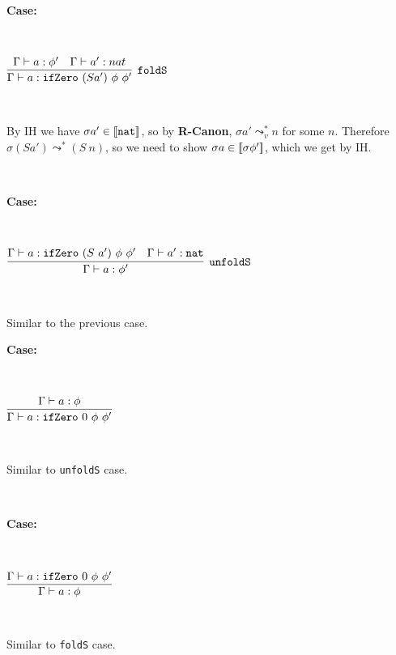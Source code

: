 \documentclass[copyright]{eptcs}
\newcommand{\nat}[0]{\texttt{nat}}
\newcommand{\leadstov}[0]{\leadsto_v}
\newcommand{\ifzero}[0]{\texttt{ifZero}}
\newcommand{\interp}[1]{[\negthinspace[#1]\negthinspace]}
\begin{document}
\ 

\noindent \textbf{Case:}

\

$\infer[\texttt{foldS}]
{\Gamma\vdash a : \ifzero\ (S a')\ \phi\ \phi'}
{\Gamma\vdash a : \phi' & \Gamma\vdash a':nat}$

\ 

\noindent By IH we have $\sigma a' \in \interp{\nat}$, so by \textbf{R-Canon}, $\sigma a' \leadstov^* n$ for some $n$. Therefore 
$\sigma (S a') \leadsto^* (S\ n)$, so we need to show $\sigma a \in \interp{\sigma\phi'}$, which we get by IH.

\

\noindent \textbf{Case:}

\

$\infer[\texttt{unfoldS}]
{\Gamma\vdash a : \phi'}
{\Gamma\vdash a : \ifzero\ (S\ a')\ \phi\ \phi' & \Gamma\vdash a':\nat}$

\ 

\noindent Similar to the previous case.


\noindent \textbf{Case:}

\

$\infer
{\Gamma\vdash a : \ifzero\ 0\ \phi\ \phi'}
{\Gamma\vdash a : \phi}$

\ 

\noindent Similar to \texttt{unfoldS} case.

\

\noindent \textbf{Case:}

\

$\infer
{\Gamma\vdash a : \phi}
{\Gamma\vdash a : \ifzero\ 0\ \phi\ \phi'}$

\ 

\noindent Similar to \texttt{foldS} case.

\

\fi 
\end{document}
